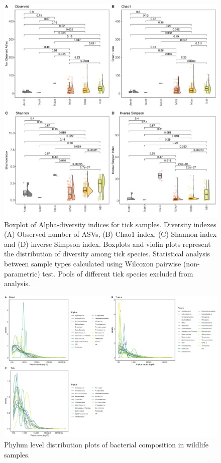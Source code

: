 \documentclass[a4paper, nobind]{templates/ociamthesis}
\begin{document}
\begin{figure}
\includegraphics[width=0.95\linewidth]{figures/ms-figs-appendix/FigA-3.3} \caption[Alpha diversity of microbiome community for tick samples.]{Boxplot of Alpha-diversity indices for tick samples. Diversity indexes (A) Observed number of ASVs, (B) Chao1 index, (C) Shannon index and (D) inverse Simpson index. Boxplots and violin plots represent the distribution of diversity among tick species. Statistical analysis between sample types calculated using Wilcoxon pairwise (non-parametric) test. Pools of different tick species excluded from analysis.}\label{fig:FA33}
\end{figure}

\newpage

\begin{figure}
\includegraphics[width=0.95\linewidth]{figures/ms-figs-appendix/FigA-3.4} \caption[Phylum level distribution plots.]{Phylum level distribution plots of bacterial composition in wildlife samples.}\label{fig:FA34}
\end{figure}
\end{document}
